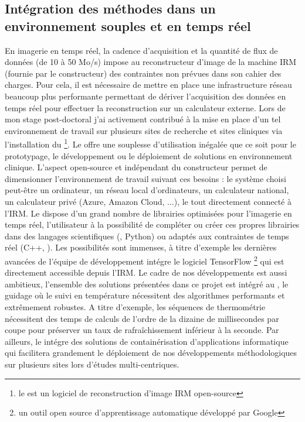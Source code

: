 
\subsection{Intégration des méthodes dans un environnement souples et en temps réel}

En imagerie en temps réel, la cadence d’acquisition et la quantité de flux de données (de 10 à 50 Mo/s) impose au reconstructeur d’image de la machine IRM (fournie par le constructeur) des contraintes non prévues dans son cahier des charges. Pour cela, il est nécessaire de mettre en place une infrastructure réseau beaucoup plus performante permettant de dériver l’acquisition des données en temps réel pour effectuer la reconstruction sur un calculateur externe. Lors de mon stage post-doctoral j’ai activement contribué à la mise en place d’un tel environnement de travail sur plusieurs sites de recherche et sites cliniques via l’installation du \GADGETRON\footnote{le \GADGETRON est un logiciel de reconstruction d’image IRM open-source}. Le \GADGETRON offre une souplesse d’utilisation inégalée que ce soit pour le prototypage, le développement ou le déploiement de solutions en environnement clinique. L’aspect open-source et indépendant du constructeur permet de dimensionner l’environnement de travail suivant ces besoins : le système choisi peut-être un ordinateur, un réseau local d’ordinateurs, un calculateur national, un calculateur privé (Azure, Amazon Cloud, ...), le tout directement connecté à l’IRM. Le \GADGETRON dispose d’un grand nombre de librairies optimisées pour l’imagerie en temps réel, l’utilisateur à la possibilité de compléter ou créer ces propres librairies dans des langages scientifiques (\MATLAB, Python) ou adaptés aux contraintes de temps réel (C++, \CUDA). Les possibilités sont immenses, à titre d’exemple les dernières avancées de l’équipe de développement intégre le logiciel TensorFlow \footnote{un outil open source d’apprentissage automatique développé par Google} qui est directement accessible depuis l’IRM. Le cadre de nos développements est aussi ambitieux, l’ensemble des solutions présentées dans ce projet est intégré au \GADGETRON, le guidage où le suivi en température nécessitent des algorithmes performants et extrêmement robustes. A titre d’exemple, les séquences de thermométrie nécessitent des temps de calculs de l’ordre de la dizaine de millisecondes par coupe pour préserver un taux de rafraîchissement inférieur à la seconde. Par ailleurs, le \GADGETRON intégre des solutions de containérisation d’applications informatique qui facilitera grandement le déploiement de nos développements méthodologiques sur plusieurs sites lors d’études multi-centriques\cite{de2024fully,de2024advanced}.\\
